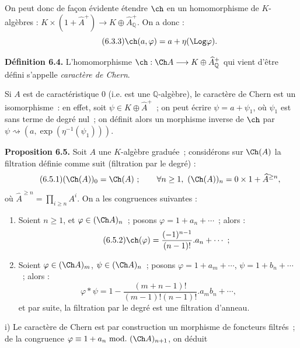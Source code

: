 
On
peut donc de façon évidente étendre \(\ch\) en un homomorphisme de \(K\)-algèbres : \(K\times(1+\widehat A^+)\longrightarrow K\oplus\widehat A_{\mathbb Q}^{+}\). On a donc :
\begin{equation}\tag{6.3.3}
  \ch(a,\varphi)=a+\eta(\Log\varphi).
\end{equation}

\textbf{Définition 6.4.} L'homomorphisme \(\ch:\Ch A\longrightarrow K\oplus\widehat A_{\mathbb Q}^{+}\) qui vient d'être défini s'appelle \emph{caractère de Chern}.

Si \(A\) est de caractéristique \(0\) (i.e. est une \(\mathbb Q\)-algèbre), le caractère de Chern est un isomorphisme~: en effet, soit \(\psi\in K\oplus\widehat A^+\)~; on peut écrire \(\psi=a+\psi_1\), où \(\psi_1\) est sans terme de degré nul~; on définit alors un morphisme inverse de \(\ch\) par \(\psi\rightsquigarrow(a,\exp(\eta^{-1}(\psi_1)))\).

\textbf{Proposition 6.5.} Soit \(A\) une \(K\)-algèbre graduée~; considérons sur \(\Ch(A)\) la filtration définie comme suit (filtration par le degré) :
\begin{equation}\tag{6.5.1}
  (\Ch(A))_0=\Ch(A)~;\qquad
  \forall n\ge1,\ (\Ch(A))_n=0\times 1+\widehat A^{\ge n},
\end{equation}
où \(\widehat A^{\ge n}=\prod_{i\ge n}A^i\). On a les congruences suivantes :

\begin{enumerate}[label=\roman*)]
\item Soient \(n\ge1\), et \(\varphi\in(\Ch A)_n\)~; posons \(\varphi=1+a_n+\cdots\)~; alors :
\begin{equation}\tag{6.5.2}
  \ch(\varphi)=\frac{(-1)^{n-1}}{(n-1)!}.a_n+\cdots~;
\end{equation}

\item Soient \(\varphi\in(\Ch A)_m\), \(\psi\in(\Ch A)_n\)~; posons
\(\varphi=1+a_m+\cdots\), \(\psi=1+b_n+\cdots\)~; alors :
\begin{equation}\tag{6.5.3}
  \varphi*\psi
  =
  1-\frac{(m+n-1)!}{(m-1)!(n-1)!}.a_m b_n+\cdots,
\end{equation}
et par suite, la filtration par le degré est une filtration d'anneau.
\end{enumerate}

i) Le caractère de Chern est par construction un morphisme de foncteurs filtrés~; de la congruence \(\varphi\equiv1+a_n\ \mathrm{mod.}\ (\Ch A)_{n+1}\), on déduit

